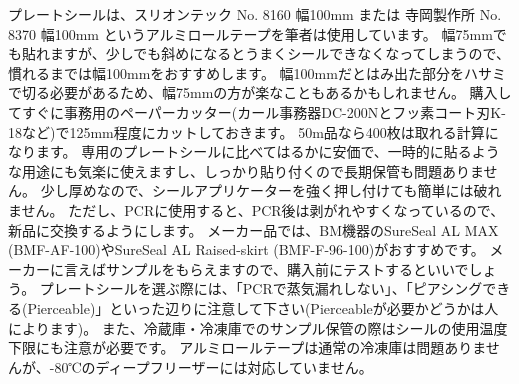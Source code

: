 \documentclass[titlepage,10pt,a4paper,uplatex]{jsbook}
\begin{document}
プレートシールは、スリオンテック No. 8160 幅100mm または 寺岡製作所 No. 8370 幅100mm というアルミロールテープを筆者は使用しています。
幅75mmでも貼れますが、少しでも斜めになるとうまくシールできなくなってしまうので、慣れるまでは幅100mmをおすすめします。
幅100mmだとはみ出た部分をハサミで切る必要があるため、幅75mmの方が楽なこともあるかもしれません。
購入してすぐに事務用のペーパーカッター(カール事務器DC-200Nとフッ素コート刃K-18など)で125mm程度にカットしておきます。
50m品なら400枚は取れる計算になります。
専用のプレートシールに比べてはるかに安価で、一時的に貼るような用途にも気楽に使えますし、しっかり貼り付くので長期保管も問題ありません。
少し厚めなので、シールアプリケーターを強く押し付けても簡単には破れません。
ただし、PCRに使用すると、PCR後は剥がれやすくなっているので、新品に交換するようにします。
メーカー品では、BM機器のSureSeal AL MAX (BMF-AF-100)やSureSeal AL Raised-skirt (BMF-F-96-100)がおすすめです。
メーカーに言えばサンプルをもらえますので、購入前にテストするといいでしょう。
プレートシールを選ぶ際には、「PCRで蒸気漏れしない」、「ピアシングできる(Pierceable)」といった辺りに注意して下さい(Pierceableが必要かどうかは人によります)。
また、冷蔵庫・冷凍庫でのサンプル保管の際はシールの使用温度下限にも注意が必要です。
アルミロールテープは通常の冷凍庫は問題ありませんが、-80℃のディープフリーザーには対応していません。
\end{document}
